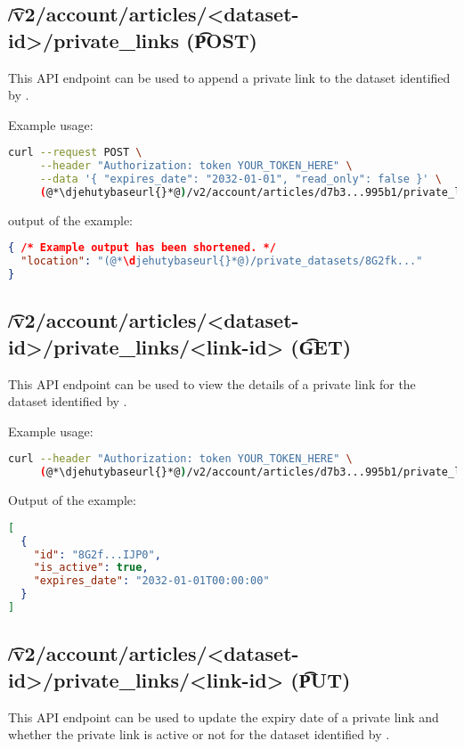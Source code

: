 \subsection{\t{/v2/account/articles/<dataset-id>/private\_links} (\t{POST})}

  This API endpoint can be used to append a private link to the dataset
  identified by .

  Example usage:
\begin{lstlisting}[language=bash]
curl --request POST \
     --header "Authorization: token YOUR_TOKEN_HERE" \
     --data '{ "expires_date": "2032-01-01", "read_only": false }' \
     (@*\djehutybaseurl{}*@)/v2/account/articles/d7b3...995b1/private_links | jq
\end{lstlisting}

  output of the example:
\begin{lstlisting}[language=JSON]
{ /* Example output has been shortened. */
  "location": "(@*\djehutybaseurl{}*@)/private_datasets/8G2fk..."
}
\end{lstlisting}

\subsection{\t{/v2/account/articles/<dataset-id>/private\_links/<link-id>} (\t{GET})}

  This API endpoint can be used to view the details of a private link for
  the dataset identified by \code{dataset-id}.

  Example usage:
\begin{lstlisting}[language=bash]
curl --header "Authorization: token YOUR_TOKEN_HERE" \
     (@*\djehutybaseurl{}*@)/v2/account/articles/d7b3...995b1/private_links/8G2fk... | jq
\end{lstlisting}

  Output of the example:
\begin{lstlisting}[language=JSON]
[
  {
    "id": "8G2f...IJP0",
    "is_active": true,
    "expires_date": "2032-01-01T00:00:00"
  }
]
\end{lstlisting}

\subsection{\t{/v2/account/articles/<dataset-id>/private\_links/<link-id>} (\t{PUT})}

  This API endpoint can be used to update the expiry date of a private link
  and whether the private link is active or not for the dataset identified
  by \code{dataset-id}.

